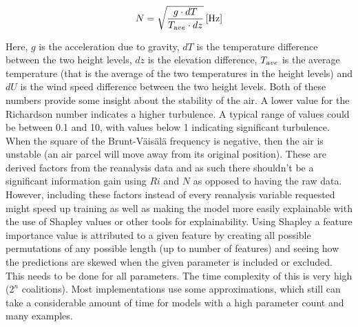 \begin{equation}
    \label{eqn:N}
    N = \sqrt{\frac{g \cdot dT }{T_{\textrm ave} \cdot dz}} \, \mathrm{[Hz]}
\end{equation}

Here, $g$ is the acceleration due to gravity, $dT$ is the temperature difference between the two height levels, $dz$ is the elevation difference, $T_{\textrm ave}$ is the average temperature (that is the average of the two temperatures in the height levels) and $dU$ is the wind speed difference between the two height levels. Both of these numbers provide some insight about the stability of the air. A lower value for the Richardson number indicates a higher turbulence. A typical range of values could be between 0.1 and 10, with values below 1 indicating significant turbulence\cite{richardson_number_skybrary}. When the square of the Brunt-Väisälä frequency is negative, then the air is unstable (an air parcel will move away from its original position)\cite{brunt_vaisala_freq_eumtrain}. These are derived factors from the reanalysis data and as such there shouldn't be a significant information gain using $Ri$ and $N$ as opposed to having the raw data. However, including these factors instead of every reanalysis variable requested might speed up training as well as making the model more easily explainable with the use of Shapley values or other tools for explainability. Using Shapley a feature importance value is attributed to a given feature by creating all possible permutations of any possible length (up to number of features) and seeing how the predictions are skewed when the given parameter is included or excluded. This needs to be done for all parameters. The time complexity of this is very high ($2^n$ coalitions)\cite{shapley_information}. Most implementations use some approximations, which still can take a considerable amount of time for models with a high parameter count and many examples.